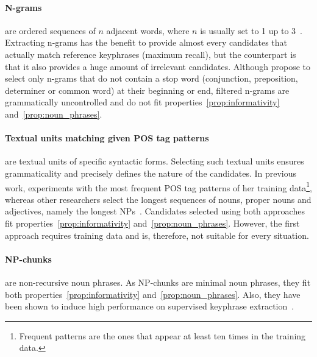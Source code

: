  \paragraph{N-grams} are ordered sequences of $n$ adjacent words, where $n$ is
  usually set to 1 up to 3~\cite{witten1999kea}. Extracting n-grams has the
  benefit to provide almost every candidates that actually match reference
  keyphrases (maximum recall), but the counterpart is that it also provides a
  huge amount of irrelevant candidates. Although 
  propose to select only n-grams that do not contain a stop word (conjunction,
  preposition, determiner or common word) at their beginning or end, filtered
  n-grams are grammatically uncontrolled and do not fit
  properties~\ref{prop:informativity} and~\ref{prop:noun_phrases}.

  \paragraph{Textual units matching given POS tag patterns} are textual units of
  specific syntactic forms. Selecting such textual units ensures grammaticality
  and precisely defines the nature of the candidates. In previous work,
   experiments with the most frequent POS
  tag patterns of her training data\footnote{Frequent patterns are the ones that
  appear at least ten times in the training data.}, whereas other researchers
  select the longest sequences of nouns, proper nouns and adjectives, namely
  the longest NPs~\cite{hassan2010conundrums}. Candidates selected using both
  approaches fit properties~\ref{prop:informativity}
  and~\ref{prop:noun_phrases}. However, the first approach requires training
  data and is, therefore, not suitable for every situation.

  \paragraph{NP-chunks} are non-recursive noun phrases. As NP-chunks are minimal
  noun phrases, they fit both properties~\ref{prop:informativity}
  and~\ref{prop:noun_phrases}. Also, they have been shown to induce high
  performance on supervised keyphrase
  extraction~\cite{hulth2003keywordextraction}.

